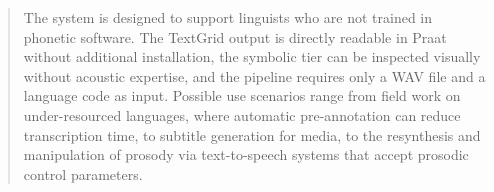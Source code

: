 \begin{abstract}
The system is designed to support linguists who are not trained in phonetic software. The TextGrid output is directly readable in Praat without additional installation, the symbolic tier can be inspected visually without acoustic expertise, and the pipeline requires only a WAV file and a language code as input. Possible use scenarios range from field work on under-resourced languages, where automatic pre-annotation can reduce transcription time, to subtitle generation for media, to the resynthesis and manipulation of prosody via text-to-speech systems that accept prosodic control parameters.
\newpage
\end{abstract}





